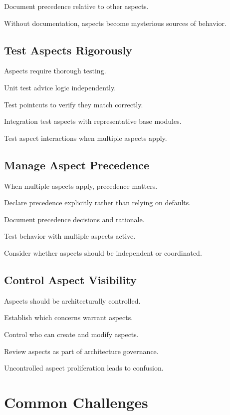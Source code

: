 \documentclass[11pt]{article}
\begin{document}
Document precedence relative to other aspects.

Without documentation, aspects become mysterious sources of behavior.

\subsection{Test Aspects Rigorously}

Aspects require thorough testing.

Unit test advice logic independently.

Test pointcuts to verify they match correctly.

Integration test aspects with representative base modules.

Test aspect interactions when multiple aspects apply.

\subsection{Manage Aspect Precedence}

When multiple aspects apply, precedence matters.

Declare precedence explicitly rather than relying on defaults.

Document precedence decisions and rationale.

Test behavior with multiple aspects active.

Consider whether aspects should be independent or coordinated.

\subsection{Control Aspect Visibility}

Aspects should be architecturally controlled.

Establish which concerns warrant aspects.

Control who can create and modify aspects.

Review aspects as part of architecture governance.

Uncontrolled aspect proliferation leads to confusion.

\section{Common Challenges}
\end{document}
